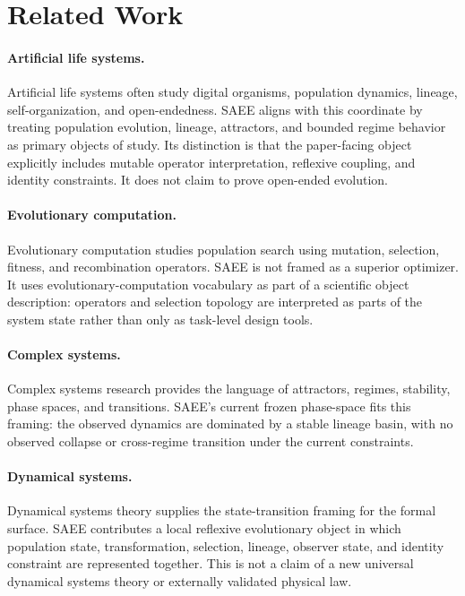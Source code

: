 \section{Related Work}

\paragraph{Artificial life systems.}
Artificial life systems often study digital organisms, population dynamics,
lineage, self-organization, and open-endedness. SAEE aligns with this
coordinate by treating population evolution, lineage, attractors, and bounded
regime behavior as primary objects of study. Its distinction is that the
paper-facing object explicitly includes mutable operator interpretation,
reflexive coupling, and identity constraints. It does not claim to prove
open-ended evolution.

\paragraph{Evolutionary computation.}
Evolutionary computation studies population search using mutation, selection,
fitness, and recombination operators. SAEE is not framed as a superior
optimizer. It uses evolutionary-computation vocabulary as part of a scientific
object description: operators and selection topology are interpreted as parts
of the system state rather than only as task-level design tools.

\paragraph{Complex systems.}
Complex systems research provides the language of attractors, regimes,
stability, phase spaces, and transitions. SAEE's current frozen phase-space
fits this framing: the observed dynamics are dominated by a stable lineage
basin, with no observed collapse or cross-regime transition under the current
constraints.

\paragraph{Dynamical systems.}
Dynamical systems theory supplies the state-transition framing for the formal
surface. SAEE contributes a local reflexive evolutionary object in which
population state, transformation, selection, lineage, observer state, and
identity constraint are represented together. This is not a claim of a new
universal dynamical systems theory or externally validated physical law.

